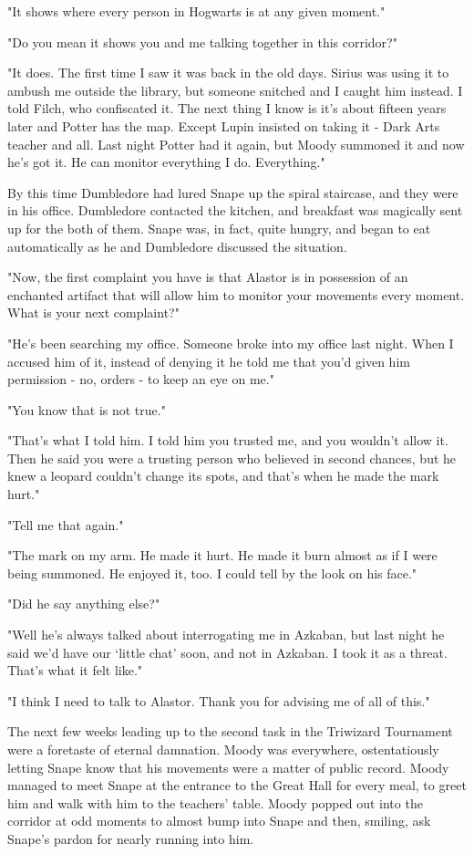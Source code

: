 "It shows where every person in Hogwarts is at any given moment."

"Do you mean it shows you and me talking together in this corridor?"

"It does. The first time I saw it was back in the old days. Sirius was using it to ambush me outside the library, but someone snitched and I caught him instead. I told Filch, who confiscated it. The next thing I know is it's about fifteen years later and Potter has the map. Except Lupin insisted on taking it - Dark Arts teacher and all. Last night Potter had it again, but Moody summoned it and now he's got it. He can monitor everything I do. Everything."

By this time Dumbledore had lured Snape up the spiral staircase, and they were in his office. Dumbledore contacted the kitchen, and breakfast was magically sent up for the both of them. Snape was, in fact, quite hungry, and began to eat automatically as he and Dumbledore discussed the situation.

"Now, the first complaint you have is that Alastor is in possession of an enchanted artifact that will allow him to monitor your movements every moment. What is your next complaint?"

"He's been searching my office. Someone broke into my office last night. When I accused him of it, instead of denying it he told me that you'd given him permission - no, orders - to keep an eye on me."

"You know that is not true."

"That's what I told him. I told him you trusted me, and you wouldn't allow it. Then he said you were a trusting person who believed in second chances, but he knew a leopard couldn't change its spots, and that's when he made the mark hurt."

"Tell me that again."

"The mark on my arm. He made it hurt. He made it burn almost as if I were being summoned. He enjoyed it, too. I could tell by the look on his face."

"Did he say anything else?"

"Well he's always talked about interrogating me in Azkaban, but last night he said we'd have our `little chat' soon, and not in Azkaban. I took it as a threat. That's what it felt like."

"I think I need to talk to Alastor. Thank you for advising me of all of this."

The next few weeks leading up to the second task in the Triwizard Tournament were a foretaste of eternal damnation. Moody was everywhere, ostentatiously letting Snape know that his movements were a matter of public record. Moody managed to meet Snape at the entrance to the Great Hall for every meal, to greet him and walk with him to the teachers' table. Moody popped out into the corridor at odd moments to almost bump into Snape and then, smiling, ask Snape's pardon for nearly running into him.


